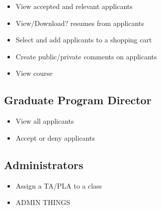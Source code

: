 \documentclass[11pt]{amsart}
\begin{document}
\begin{itemize}
    \item{View accepted and relevant applicants}
    \item{View/Download? resumes from applicants}
    \item{Select and add applicants to a shopping cart}
    \item{Create public/private comments on applicants}
    \item{View course}
\end{itemize}

\subsection{Graduate Program Director}

\begin{itemize}
    \item{View all applicants}
    \item{Accept or deny applicants}
\end{itemize}

\subsection{Administrators}

\begin{itemize}
    \item{Assign a TA/PLA to a class}
    \item{ADMIN THINGS}
\end{itemize}
\end{document}
